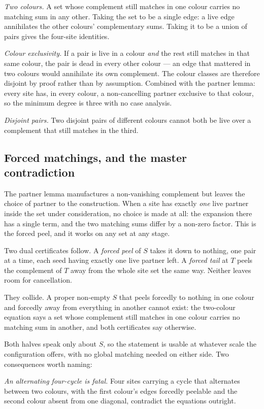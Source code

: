 \documentclass[11pt]{article}
\theoremstyle{definition}
\theoremstyle{remark}
\begin{document}
\emph{Two colours.} A set whose complement still matches in one colour carries no
matching sum in any other. Taking the set to be a single edge: a live edge annihilates
the other colours' complementary sums. Taking it to be a union of pairs gives the
four-site identities.

\emph{Colour exclusivity.} If a pair is live in a colour \emph{and} the rest still
matches in that same colour, the pair is dead in every other colour --- an edge that
mattered in two colours would annihilate its own complement. The colour classes are
therefore disjoint by proof rather than by assumption. Combined with the partner lemma:
every site has, in every colour, a non-cancelling partner exclusive to that colour, so
the minimum degree is three with no case analysis.

\emph{Disjoint pairs.} Two disjoint pairs of different colours cannot both be live over
a complement that still matches in the third.

\subsection*{Forced matchings, and the master contradiction}

The partner lemma manufactures a non-vanishing complement but leaves the choice of
partner to the construction. When a site has exactly \emph{one} live partner inside the
set under consideration, no choice is made at all: the expansion there has a single
term, and the two matching sums differ by a non-zero factor. This is the forced peel,
and it works on any set at any stage.

Two dual certificates follow. A \emph{forced peel} of $S$ takes it down to nothing, one
pair at a time, each seed having exactly one live partner left. A \emph{forced tail} at
$T$ peels the complement of $T$ away from the whole site set the same way. Neither
leaves room for cancellation.

They collide. A proper non-empty $S$ that peels forcedly to nothing in one colour and
forcedly away from everything in another cannot exist: the two-colour equation says a
set whose complement still matches in one colour carries no matching sum in another, and
both certificates say otherwise.

Both halves speak only about $S$, so the statement is usable at whatever scale the
configuration offers, with no global matching needed on either side. Two consequences
worth naming:

\emph{An alternating four-cycle is fatal.} Four sites carrying a cycle that alternates
between two colours, with the first colour's edges forcedly peelable and the second
colour absent from one diagonal, contradict the equations outright.
\end{document}
